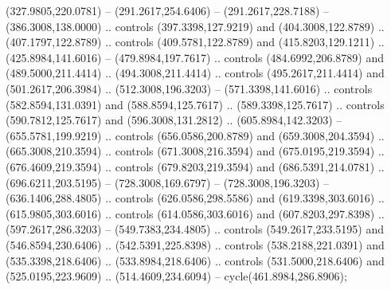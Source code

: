 {{\begin{scope}[y=-0.80pt,x=0.80pt,scale=0.038,xshift=-412pt,yshift=172pt]
        (327.9805,220.0781) -- (291.2617,254.6406) -- (291.2617,228.7188) --
        (386.3008,138.0000) .. controls (397.3398,127.9219) and (404.3008,122.8789) ..
        (407.1797,122.8789) .. controls (409.5781,122.8789) and (415.8203,129.1211) ..
        (425.8984,141.6016) -- (479.8984,197.7617) .. controls (484.6992,206.8789) and
        (489.5000,211.4414) .. (494.3008,211.4414) .. controls (495.2617,211.4414) and
        (501.2617,206.3984) .. (512.3008,196.3203) -- (571.3398,141.6016) .. controls
        (582.8594,131.0391) and (588.8594,125.7617) .. (589.3398,125.7617) .. controls
        (590.7812,125.7617) and (596.3008,131.2812) .. (605.8984,142.3203) --
        (655.5781,199.9219) .. controls (656.0586,200.8789) and (659.3008,204.3594) ..
        (665.3008,210.3594) .. controls (671.3008,216.3594) and (675.0195,219.3594) ..
        (676.4609,219.3594) .. controls (679.8203,219.3594) and (686.5391,214.0781) ..
        (696.6211,203.5195) -- (728.3008,169.6797) -- (728.3008,196.3203) --
        (636.1406,288.4805) .. controls (626.0586,298.5586) and (619.3398,303.6016) ..
        (615.9805,303.6016) .. controls (614.0586,303.6016) and (607.8203,297.8398) ..
        (597.2617,286.3203) -- (549.7383,234.4805) .. controls (549.2617,233.5195) and
        (546.8594,230.6406) .. (542.5391,225.8398) .. controls (538.2188,221.0391) and
        (535.3398,218.6406) .. (533.8984,218.6406) .. controls (531.5000,218.6406) and
        (525.0195,223.9609) .. (514.4609,234.6094) -- cycle(461.8984,286.8906);
    \end{scope}
  }
}